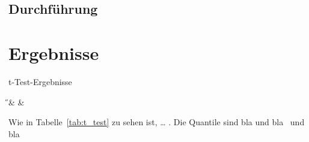     \subsection{Durchführung} %
    \label{sub:durchführung}
    

\section{Ergebnisse} %
    \label{sec:ergebnisse}

    \begin{table}
        \centering
        \caption{t-Test-Ergebnisse}
        \label{tab:t_test}
        {\H & \pH & \NaCl}
    \end{table}
    Wie in Tabelle~\ref{tab:t_test} zu sehen ist, \dots
    \cite{aristotle:physics}. Die Quantile sind bla und bla\ \cite[vgl.][]{web:t-values} und bla\ \cite[vgl.][]{web:Gartenratgeber}
